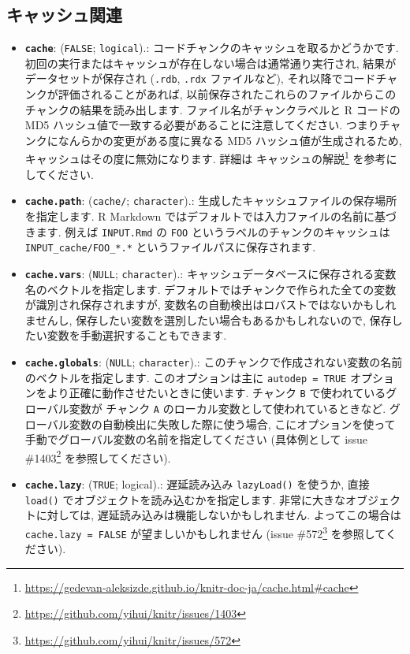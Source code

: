 \documentclass[
  11pt,
]{bxjsreport}
\providecommand{\tightlist}{%
  \setlength{\itemsep}{0pt}\setlength{\parskip}{0pt}}
\renewcommand{\href}[2]{#2\footnote{\url{#1}}}
\begin{document}
\hypertarget{cache-options}{%
\subsection{キャッシュ関連}\label{cache-options}}

\begin{itemize}
\tightlist
\item
  \textbf{\texttt{cache}}: (\texttt{FALSE}; \texttt{logical}).: コードチャンクのキャッシュを取るかどうかです. 初回の実行またはキャッシュが存在しない場合は通常通り実行され, 結果がデータセットが保存され (\texttt{.rdb}, \texttt{.rdx} ファイルなど), それ以降でコードチャンクが評価されることがあれば, 以前保存されたこれらのファイルからこのチャンクの結果を読み出します. ファイル名がチャンクラベルと R コードの MD5 ハッシュ値で一致する必要があることに注意してください. つまりチャンクになんらかの変更がある度に異なる MD5 ハッシュ値が生成されるため, キャッシュはその度に無効になります. 詳細は \href{https://gedevan-aleksizde.github.io/knitr-doc-ja/cache.html\#cache}{キャッシュの解説} を参考にしてください.
\item
  \textbf{\texttt{cache.path}}: (\texttt{\textquotesingle{}cache/\textquotesingle{}}; \texttt{character}).: 生成したキャッシュファイルの保存場所を指定します. R Markdown ではデフォルトでは入力ファイルの名前に基づきます. 例えば \texttt{INPUT.Rmd} の \texttt{FOO} というラベルのチャンクのキャッシュは \texttt{INPUT\_cache/FOO\_*.*} というファイルパスに保存されます.
\item
  \textbf{\texttt{cache.vars}}: (\texttt{NULL}; \texttt{character}).: キャッシュデータベースに保存される変数名のベクトルを指定します. デフォルトではチャンクで作られた全ての変数が識別され保存されますが, 変数名の自動検出はロバストではないかもしれませんし, 保存したい変数を選別したい場合もあるかもしれないので, 保存したい変数を手動選択することもできます.
\item
  \textbf{\texttt{cache.globals}}: (\texttt{NULL}; \texttt{character}).: このチャンクで作成されない変数の名前のベクトルを指定します. このオプションは主に \texttt{autodep = TRUE} オプションをより正確に動作させたいときに使います. チャンク \texttt{B} で使われているグローバル変数が チャンク \texttt{A} のローカル変数として使われているときなど. グローバル変数の自動検出に失敗した際に使う場合, こにオプションを使って手動でグローバル変数の名前を指定してください (具体例として issue \href{https://github.com/yihui/knitr/issues/1403}{\#1403} を参照してください).
\item
  \textbf{\texttt{cache.lazy}}: (\texttt{TRUE}; logical).: 遅延読み込み \texttt{lazyLoad()} を使うか, 直接 \texttt{load()} でオブジェクトを読み込むかを指定します. 非常に大きなオブジェクトに対しては, 遅延読み込みは機能しないかもしれません. よってこの場合は \texttt{cache.lazy = FALSE} が望ましいかもしれません (issue \href{https://github.com/yihui/knitr/issues/572}{\#572} を参照してください).

\end{itemize}
\end{document}
